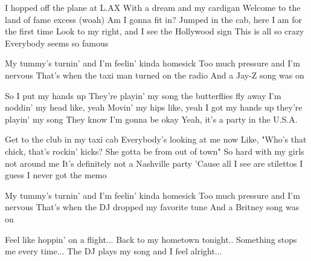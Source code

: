 \begin{verse*}
I hopped off the plane at L.AX
With a dream and my cardigan
Welcome to the land of fame excess (woah)
Am I gonna fit in?
Jumped in the cab, here I am for the first time
Look to my right, and I see the Hollywood sign
This is all so crazy
Everybody seems so famous
\end{verse*}

\begin{verse*}
My tummy's turnin' and I'm feelin' kinda homesick
Too much pressure and I'm nervous
That's when the taxi man turned on the radio
And a Jay-Z song was on 
\end{verse*}

\begin{chorus}
So I put my hands up
They're playin' my song
the butterflies fly away
I'm noddin' my head like, yeah
Movin' my hips like, yeah
I got my hands up
they're playin' my song
They know I'm gonna be okay
Yeah, it's a party in the U.S.A. 
\end{chorus}

\begin{verse*}
Get to the club in my taxi cab
Everybody's looking at me now
Like, "Who's that chick, that's rockin' kicks?
She gotta be from out of town"
So hard with my girls not around me
It's definitely not a Nashville party
'Cause all I see are stilettos
I guess I never got the memo
\end{verse*}

\begin{verse*}
My tummy's turnin' and I'm feelin' kinda homesick
Too much pressure and I'm nervous
That's when the DJ dropped my favorite tune
And a Britney song was on 
\end{verse*}

\thechorus

\begin{verse*}
Feel like hoppin' on a flight...
Back to my hometown tonight..
Something stops me every time...
The DJ plays my song and I feel alright...
\end{verse*}

\thechorus[2]